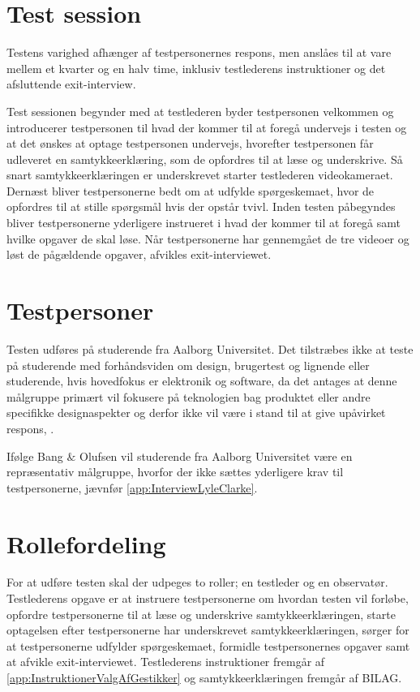 \section{Test session}
\label{TestSessionValgAfGestikker}
%
Testens varighed afhænger af testpersonernes respons, men anslåes til at vare mellem et kvarter og en halv time, inklusiv testlederens instruktioner og det afsluttende exit-interview.

Test sessionen begynder med at testlederen byder testpersonen velkommen og introducerer testpersonen til hvad der kommer til at foregå undervejs i testen og at det ønskes at optage testpersonen undervejs, hvorefter testpersonen får udleveret en samtykkeerklæring, som de opfordres til at læse og underskrive. Så snart samtykkeerklæringen er underskrevet starter testlederen videokameraet. Dernæst bliver testpersonerne bedt om at udfylde spørgeskemaet, hvor de opfordres til at stille spørgsmål hvis der opstår tvivl. Inden testen påbegyndes bliver testpersonerne yderligere instrueret i hvad der kommer til at foregå samt hvilke opgaver de skal løse. Når testpersonerne har gennemgået de tre videoer og løst de pågældende opgaver, afvikles exit-interviewet. 
%

\section{Testpersoner}
\label{TestpersonerValgAfGestikker}
%
Testen udføres på studerende fra Aalborg Universitet. Det tilstræbes ikke at teste på studerende med forhåndsviden om design, brugertest og lignende eller studerende, hvis hovedfokus er elektronik og software, da det antages at denne målgruppe primært vil fokusere på teknologien bag produktet eller andre specifikke designaspekter og derfor ikke vil være i stand til at give upåvirket respons, \parencite[s. 110]{Book:OUE}. 

Ifølge Bang $\&$ Olufsen vil studerende fra Aalborg Universitet være en repræsentativ målgruppe, hvorfor der ikke sættes yderligere krav til testpersonerne, jævnfør \autoref{app:InterviewLyleClarke}.  
%

\section{Rollefordeling}
\label{RollerfordelingValgAfGestikker}
%
For at udføre testen skal der udpeges to roller; en testleder og en observatør. Testlederens opgave er at instruere testpersonerne om hvordan testen vil forløbe, opfordre testpersonerne til at læse og underskrive samtykkeerklæringen, starte optagelsen efter testpersonerne har underskrevet samtykkeerklæringen, sørger for at testpersonerne udfylder spørgeskemaet, formidle testpersonernes opgaver samt at afvikle exit-interviewet. Testlederens instruktioner fremgår af \autoref{app:InstruktionerValgAfGestikker} og samtykkeerklæringen fremgår af BILAG. 

